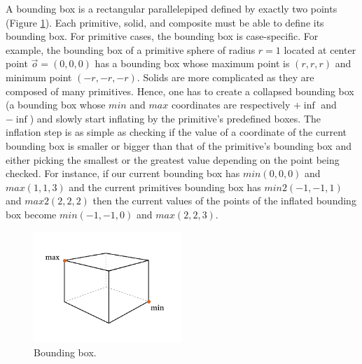 \documentclass[a4paper,11pt,oneside]{article}
\begin{document}
A bounding box is a rectangular parallelepiped defined by exactly two points (Figure \ref{sec4.2:box-points}). Each primitive, solid, and composite must be able to define its bounding box. For primitive cases, the bounding box is case-specific. For example, the bounding box of a primitive sphere of radius $r = 1$ located at center point $\vec{o} = (0, 0, 0)$ has a bounding box whose maximum point is $(r, r, r)$ and minimum point $(-r, -r, -r)$. Solids are more complicated as they are composed of many primitives. Hence, one has to create a collapsed bounding box (a bounding box whose $min$ and $max$ coordinates are respectively $+\inf$ and $-\inf$) and slowly start inflating by the primitive's predefined boxes. The inflation step is as simple as checking if the value of a coordinate of the current bounding box is smaller or bigger than that of the primitive's bounding box and either picking the smallest or the greatest value depending on the point being checked. For instance, if our current bounding box has $min(0, 0, 0)$ and $max(1, 1, 3)$ and the current primitives bounding box has $min2(-1, -1, 1)$ and $max2(2, 2, 2)$ then the current values of the points of the inflated bounding box become $min(-1, -1, 0)$ and $max(2, 2, 3)$.


\begin{figure}[ht]
	\begin{center}
		\includegraphics[width=0.5\textwidth]{section4/4.2/box-enclosure-points.png}
	\end{center}
	\caption{Bounding box.}
	\label{sec4.2:box-points}
\end{figure}
\end{document}
